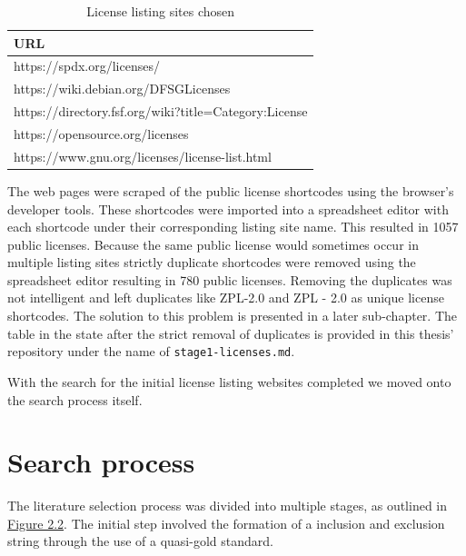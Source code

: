 \begin{table}[t]
	\begin{center}
		\begin{tabular}{||l||}
			\hline
			URL \\
			\hline
      https://spdx.org/licenses/ \\
      https://wiki.debian.org/DFSGLicenses \\
      https://directory.fsf.org/wiki?title=Category:License \\
      https://opensource.org/licenses \\
      https://www.gnu.org/licenses/license-list.html\\
			\hline
		\end{tabular}
		\caption{License listing sites chosen}
		\label{table:listing-sites}
	\end{center}
\end{table}

The web pages were scraped of the public license shortcodes using the browser's developer tools. These shortcodes were imported into a spreadsheet editor with each shortcode under their corresponding listing site name. This resulted in 1057 public licenses. Because the same public license would sometimes occur in multiple listing sites strictly duplicate shortcodes were removed using the spreadsheet editor resulting in 780 public licenses. Removing the duplicates was not intelligent and left duplicates like ZPL-2.0 and ZPL - 2.0 as unique license shortcodes. The solution to this problem is presented in a later sub-chapter. The table in the state after the strict removal of duplicates is provided in this thesis' repository \citep{mscthesis} under the name of \texttt{stage1-licenses.md}.

With the search for the initial license listing websites completed we moved onto the search process itself.

\section{Search process}
The literature selection process was divided into multiple stages, as outlined in \hyperref[fig:search-process]{Figure 2.2}. The initial step involved the formation of a inclusion and exclusion string through the use of a quasi-gold standard.


